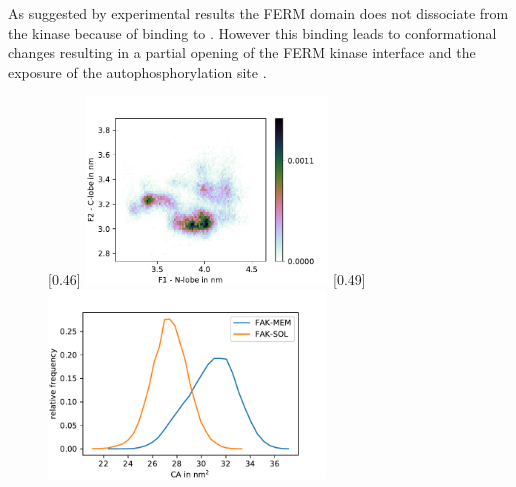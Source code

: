 As suggested by experimental results the FERM domain does not dissociate from the kinase because of binding to \pip{}. However this binding leads to conformational changes resulting in a partial opening of the FERM kinase interface and the exposure of the autophosphorylation site  \autocites{pap001}{pap003}.
%
%
%
\begin{figure}
	[0.46\textwidth]{
		\includegraphics[height=5cm]{figures/results/membr_f1f2}
	}\hfill%
	[0.49\textwidth]{
		\includegraphics[height=5cm]{figures/results/ca_sol_mem}
	}%
\end{figure}
%
%
%
